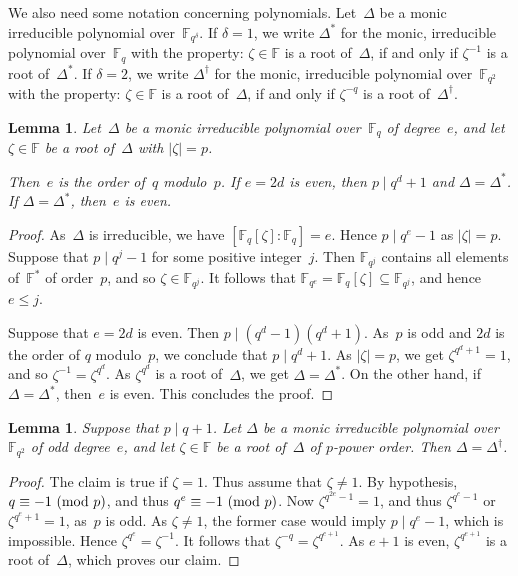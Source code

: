 \documentclass[12pt]{amsart}
\newtheorem{lem}[thm]{Lemma}
\theoremstyle{theorem}
\theoremstyle{definition}
\theoremstyle{remark}
\begin{document}
We also need some notation concerning polynomials. 
Let~$\Delta$ be a monic irreducible polynomial over~$\mathbb{F}_{q^\delta}$.
If $\delta = 1$, we write $\Delta^*$ for the monic, irreducible polynomial 
over~$\mathbb{F}_{q}$ with the property: $\zeta \in \mathbb{F}$ is a root 
of~$\Delta$, if and only if $\zeta^{-1}$ is a root of~$\Delta^*$. If 
$\delta = 2$, we write $\Delta^\dagger$ for the monic, irreducible polynomial 
over~$\mathbb{F}_{q^2}$ with the property: $\zeta \in \mathbb{F}$ is a root 
of~$\Delta$, if and only if $\zeta^{-q}$ is a root of~$\Delta^\dagger$. 

\begin{lem}
\label{DegreesOfPolynomials}
Let~$\Delta$ be a monic irreducible polynomial over~$\mathbb{F}_{q}$ of 
degree~$e$, and let $\zeta \in \mathbb{F}$ be a root of~$\Delta$ with 
$|\zeta| = p$.

Then~$e$ is the order of~$q$ modulo~$p$. If $e = 2d$ is even, then 
$p \mid q^d + 1$ and $\Delta = \Delta^*$. If $\Delta = \Delta^*$, then~$e$ 
is even. 
\end{lem}
\begin{proof}
As~$\Delta$ is irreducible, we have 
$[\mathbb{F}_q[\zeta]\colon\!\mathbb{F}_q] = e$. Hence $p \mid q^e - 1$ as 
$|\zeta| = p$. Suppose that $p \mid q^j - 1$ for some positive integer~$j$. Then 
$\mathbb{F}_{q^j}$ contains all elements of~$\mathbb{F}^*$ of order~$p$, and so
$\zeta \in \mathbb{F}_{q^j}$. It follows that $\mathbb{F}_{q^e} = 
\mathbb{F}_q[\zeta] \subseteq \mathbb{F}_{q^j}$, and hence $e \leq j$.

Suppose that $e = 2d$ is even. Then $p \mid (q^d -1 )(q^d + 1)$. As~$p$ is odd
and $2d$ is the order of $q$ modulo~$p$, we conclude that $p \mid q^d + 1$.
As $|\zeta| = p$, we get $\zeta^{q^d + 1} = 1$, and so 
$\zeta^{-1} = \zeta^{q^d}$. As $\zeta^{q^d}$ is a root of~$\Delta$, we get 
$\Delta = \Delta^*$. On the other hand, if $\Delta = \Delta^*$, then~$e$ is 
even. This concludes the proof.
\end{proof}

\begin{lem}
\label{UnitaryDelta}
Suppose that $p \mid q + 1$. 
Let $\Delta$ be a monic irreducible polynomial over~$\mathbb{F}_{q^2}$ of odd 
degree~$e$, and let $\zeta \in \mathbb{F}$ be a root of~$\Delta$ of $p$-power 
order. Then $\Delta = \Delta^{\dagger}$.
\end{lem}
\begin{proof}
The claim is true if $\zeta = 1$. Thus assume that $\zeta \neq 1$.
By hypothesis, $q \equiv - 1\,\,(\mbox{\rm mod}\,\,p)$, and thus 
$q^e \equiv - 1\,\,(\mbox{\rm mod}\,\,p)$. Now $\zeta^{q^{2e} - 1} = 1$, and 
thus $\zeta^{q^e - 1}$ or $\zeta^{q^e + 1} = 1$, as~$p$ is odd. As 
$\zeta \neq 1$, the former case would imply $p \mid q^e - 1$, which is 
impossible. Hence $\zeta^{q^e} = \zeta^{-1}$.  It follows that 
$\zeta^{-q} = \zeta^{q^{e + 1}}$. As $e + 1$ is even, 
$\zeta^{q^{e + 1}}$ is a root of~$\Delta$, which proves our claim.
\end{proof}
\end{document}
